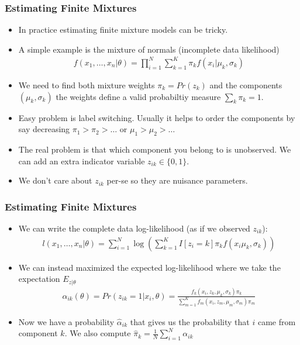 \documentclass[aspectratio=169]{beamer}
\begin{document}
\begin{frame}
\frametitle{Estimating Finite Mixtures}
\begin{itemize}
\item In practice estimating finite mixture models can be tricky.
\item A simple example is the mixture of normals (incomplete data likelihood)
\begin{eqnarray*}
f(x_1,\ldots,x_n | \theta) = \prod_{i=1}^N \sum_{k=1}^K \pi_k f(x_i | \mu_k, \sigma_k)
\end{eqnarray*}
\item We need to find both mixture weights $\pi_k = Pr(z_k)$ and the components $(\mu_k,\sigma_k)$ the weights define a valid probabiltiy measure $\sum_k \pi_k = 1$.
\item Easy problem is \alert{label switching}. Usually it helps to order the components by say decreasing $\pi_1 > \pi_2 > \ldots$ or  $\mu_1 > \mu_2 > \ldots$ 
\item The real problem is that which component you belong to is unobserved. We can add an extra indicator variable $z_{ik} \in \{0,1\}$.
\item We don't care about $z_{ik}$ per-se so they are \alert{nuisance parameters}.
\end{itemize}
\end{frame}

\begin{frame}
\frametitle{Estimating Finite Mixtures}
\begin{itemize}
\item We can write the complete data log-likelihood (as if we observed $z_{ik}$):
\begin{eqnarray*}
l(x_1,\ldots,x_n | \theta) = \sum_{i=1}^N  \log \left( \sum_{k=1}^K I[z_i = k]  \pi_k f(x_i \mu_k, \sigma_k) \right)
\end{eqnarray*}
\item We can instead maximized the expected log-likelihood where we take the expectation $E_{z|\theta}$
\begin{eqnarray*}
\alpha_{ik}(\theta) = Pr(z_{ik} =1 | x_i,\theta) = \frac{f_k(x_i,z_k,\mu_k,\sigma_k) \pi_k }{\sum_{m=1}^K f_m(x_i,z_m,\mu_m,\sigma_m) \pi_m}
\end{eqnarray*}
\item Now we have a probability $\hat{\alpha}_{ik}$ that gives us the probability that $i$ came from component $k$. We also compute $\hat{\pi}_k = \frac{1}{N} \sum_{i=1}^N \alpha_{ik}$
\end{itemize}
\end{frame}
\end{document}
